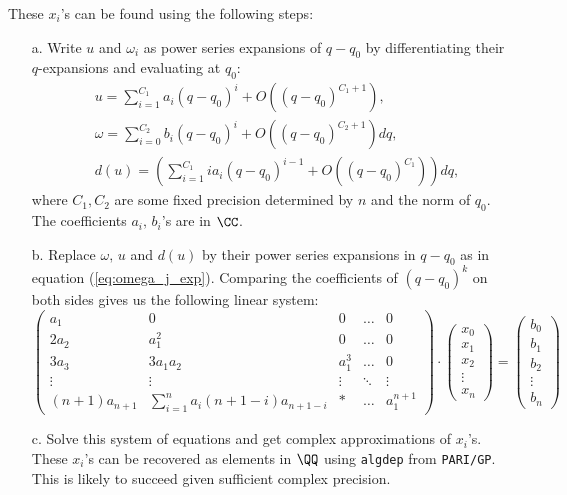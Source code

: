 \begin{algorithm}
\begin{enumerate}
These $x_i$'s can be found using the following steps:
\begin{enumerate}
    \item[a.] Write $u$ and $\omega_i$ as power series expansions of $q-q_0$ by differentiating their $q$-expansions and evaluating at $q_0$:
    \begin{align*}
    & u = \sum_{i=1}^{C_1} a_i(q-q_0)^i + O((q-q_0)^{C_1+1}),\\
    & \omega = \sum_{i=0}^{C_2} b_i(q-q_0)^i + O((q-q_0)^{C_2+1})dq,\\
    & d(u) = (\sum_{i=1}^{C_1} ia_i(q-q_0)^{i-1} + O((q-q_0)^{C_1}))dq,
\end{align*}
    where $C_1,C_2$ are some fixed precision determined by $n$ and the norm of $q_0$. The coefficients $a_i,\,b_i$'s are in $\CC$.
    \item[b.] Replace $\omega,\,u$ and $d(u)$ by their power series expansions in $q-q_0$ as in equation (\ref{eq:omega_j_exp}). Comparing the coefficients of $(q-q_0)^k$ on both sides gives us the following linear system:
    \[
\begin{pmatrix}
    a_1       & 0 & 0 & \dots & 0 \\
    2a_2       & a_1^2 & 0 & \dots & 0 \\
    3a_3       & 3a_1a_2 & a_1^3 & \dots & 0\\
    \vdots       & \vdots & \vdots & \ddots & \vdots    \\
    (n+1)a_{n+1}      & \sum_{i=1}^{n}a_i(n+1-i)a_{n+1-i} &* & \dots & a_1^{n+1}
\end{pmatrix} \cdot
\begin{pmatrix}
    x_0      \\
    x_1      \\
    x_2     \\
    \vdots   \\
    x_n
\end{pmatrix} = 
\begin{pmatrix}
    b_0   \\
    b_1     \\
    b_2  \\
    
    \vdots   \\
    b_n
\end{pmatrix}
\]
\item[c.] Solve this system of equations and get complex approximations of $x_i$'s. These $x_i$'s can be recovered as elements in $\QQ$ using \texttt{algdep} from \texttt{PARI/GP}. This is likely to succeed given sufficient complex precision.


\end{enumerate}
\end{enumerate}
\end{algorithm}
